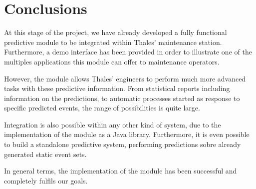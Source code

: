 \clearpage

\section{Conclusions}
At this stage of the project, we have already developed a fully functional predictive module to be integrated within Thales' maintenance station. Furthermore, a demo interface has been provided in order to illustrate one of the multiples applications this module can offer to maintenance operators.

However, the module allows Thales' engineers to perform much more advanced tasks with these predictive information. From statistical reports including information on the predictions, to automatic processes started as response to specific predicted events, the range of possibilities is quite large.

Integration is also possible within any other kind of system, due to the implementation of the module as a Java library. Furthermore, it is even possible to build a standalone predictive system, performing predictions sobre already generated static event sets.

In general terms, the implementation of the module has been successful and completely fulfils our goals.

\clearpage

 


